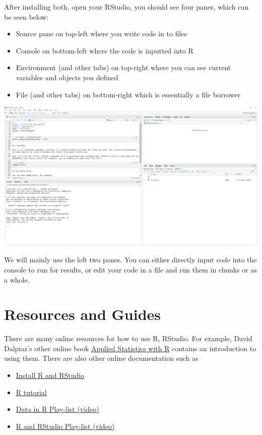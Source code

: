 \documentclass[
]{book}
\providecommand{\tightlist}{%
  \setlength{\itemsep}{0pt}\setlength{\parskip}{0pt}}
\begin{document}
After installing both, open your RStudio, you should see four panes, which can be seen below:

\begin{itemize}
\tightlist
\item
  Source pane on top-left where you write code in to files
\item
  Console on bottom-left where the code is inputted into R
\item
  Environment (and other tabs) on top-right where you can see current variables and objects you defined
\item
  File (and other tabs) on bottom-right which is essentially a file borrower
\end{itemize}

\includegraphics[width=1\textwidth,height=\textheight]{images/RStudio.png}

We will mainly use the left two panes. You can either directly input code into the console to run for results, or edit your code in a file and run them in chunks or as a whole.

\hypertarget{r-basic}{%
\section{Resources and Guides}\label{r-basic}}

There are many online resources for how to use R, RStudio. For example, David Dalpiaz's other online book \href{http://daviddalpiaz.github.io/appliedstats/}{Applied Statistics with R} contains an introduction to using them. There are also other online documentation such as

\begin{itemize}
\tightlist
\item
  \href{https://www.youtube.com/watch?v=cX532N_XLIs\&t=19s/}{Install R and RStudio}
\item
  \href{http://www.r-tutor.com/r-introduction}{R tutorial}
\item
  \href{https://www.youtube.com/playlist?list=PLBgxzZMu3GpPojVSoriMTWQCUno_3hjNi}{Data in R Play-list (video)}
\item
  \href{https://www.youtube.com/playlist?list=PLBgxzZMu3GpMjYhX7jLm5B9gEV7AOOJ5w}{R and RStudio Play-list (video)}
\end{itemize}
\end{document}
